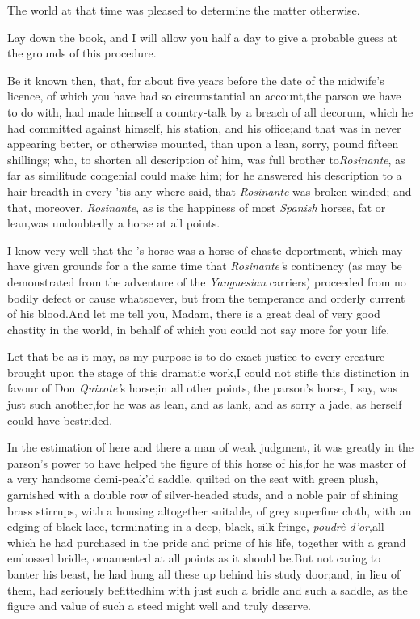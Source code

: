 \documentclass{article}
\begin{document}
The world at that time was pleased to determine the matter
otherwise.

Lay down the book, and I will allow you half a day to give a
probable guess at the grounds of this procedure.

Be it known then, that, for about five years before the date of
the midwife’s licence, of which you have had so
circumstantial an account,\tsk  the parson we have to do with, had
made himself a country-talk by a breach of all decorum, which he
had committed against himself, his station, and his
office;\tsk  and that was in never appearing better, or otherwise
mounted, than upon a lean, sorry,\break
{}
pound fifteen shillings; who, to shorten all description of
him, was full brother to\break \textit{Rosinante}, as far as similitude
congenial could make him; for he answered his description to a
hair-breadth in every\break
{}
’tis any where said, that \textit{Rosinante} was broken-winded;
and that, moreover, \textit{Rosinante}, as is the happiness of most
\textit{Spanish} horses, fat or lean,\tsk  was undoubtedly a horse
at all points.

I know very well that the ’s\break
horse was a horse of chaste deportment, which may
have given grounds for a 
the same time that \textit{Rosinante’}s continen\-cy (as may
be demonstrated from the adventure of the \textit{Yanguesian}
carriers) proceeded from no bodily defect or cause whatsoever, but
from the temperance and orderly current of his blood.\tsk  And\break
let me tell you, Madam, there is a great deal of very good chastity in the world, in
behalf of which you could not say more for your life.

Let that be as it may, as my purpose is to do exact justice to
every creature brought upon the stage of this dramatic
work,\tsk  I could not stifle this distinction in favour of Don
\textit{Quixote’}s horse;\tsh  in all other points, the
parson’s horse, I say, was just such another,\tsk for he was as
lean, and as lank, and as sorry a jade, as 
herself could have bestrided.

In the estimation of here and there a man of weak judgment, it was greatly
in the parson’s power to have helped the figure of
this horse of his,\tsk  for he was master of a very handsome
demi-peak’d saddle, quilted on the seat with green plush,
garnished with a double row of silver-headed studs, and a noble
pair of shining brass stirrups, with a housing altogether
suitable, of grey superfine cloth, with an edging of black lace,
terminating in a deep, black, silk fringe, \textit{poudrè
d’or},\tsk  all which he had purchased in the pride and prime of
his life, together with a grand embossed bridle, ornamented at
all points as it should be.\tsh  But not caring to banter his
beast, he had hung all these up behind his study door;\tsk and, in
lieu of them, had seriously befitted\break him with just such a bridle
and such a saddle, as the figure and value of such a steed might
well and truly deserve.
\end{document}
